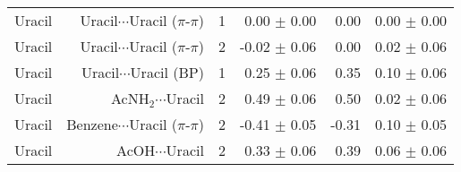 \begin{table}
\begin{adjustbox}{center}
\begin{tabular}{lrrrrr}
Uracil & Uracil$\cdots$Uracil ($\pi$-$\pi$) & 1 & 0.00 $\pm$ 0.00 & 0.00 & 0.00 $\pm$ 0.00 \\
Uracil & Uracil$\cdots$Uracil ($\pi$-$\pi$) & 2 & -0.02 $\pm$ 0.06 & 0.00 & 0.02 $\pm$ 0.06 \\
Uracil & Uracil$\cdots$Uracil (BP) & 1 & 0.25 $\pm$ 0.06 & 0.35 & 0.10 $\pm$ 0.06 \\
Uracil & AcNH$_2$$\cdots$Uracil & 2 & 0.49 $\pm$ 0.06 & 0.50 & 0.02 $\pm$ 0.06 \\
Uracil & Benzene$\cdots$Uracil ($\pi$-$\pi$) & 2 & -0.41 $\pm$ 0.05 & -0.31 & 0.10 $\pm$ 0.05 \\
Uracil & AcOH$\cdots$Uracil & 2 & 0.33 $\pm$ 0.06 & 0.39 & 0.06 $\pm$ 0.06 \\
\bottomrule
\end{tabular}
\end{adjustbox}
\end{table}
